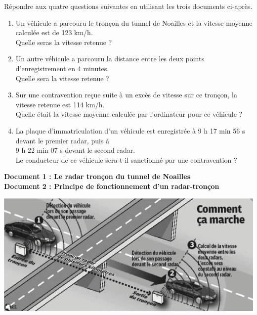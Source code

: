 \begin{exercice}[CRPE 2019 G2]
   Répondre aux quatre questions suivantes en utilisant les trois documents ci-après.
   \begin{enumerate}
      \item Un véhicule a parcouru le tronçon du tunnel de Noailles et la vitesse moyenne calculée est de 123 km/h.\\
         Quelle seras la vitesse retenue ?
      \item Un autre véhicule a parcouru la distance entre les deux points d’enregistrement en 4 minutes. \\
         Quelle sera la vitesse retenue ?
      \item Sur une contravention reçue suite à un excès de vitesse sur ce tronçon, la vitesse retenue est 114 km/h. \\
         Quelle était la vitesse moyenne calculée par l’ordinateur pour ce véhicule ?
      \item La plaque d’immatriculation d’un véhicule est enregistrée à 9 h 17 min 56 s devant le premier radar, puis à \\
         9 h 22 min 07 s devant le second radar. \\
         Le conducteur de ce véhicule sera-t-il sanctionné par une contravention ?
   \end{enumerate}
   \vfill
   \begin{center}
      {\bf Document 1 : Le radar tronçon du tunnel de Noailles} \\ [1mm]
      \vfill
      {\bf Document 2 : Principe de fonctionnement d'un radar-tronçon}
      \begin{center}
         \includegraphics[width=15cm]{Organisation_gestion_donnees/Images/D6_ex_radar}

\end{center}
\end{center}
\end{exercice}
